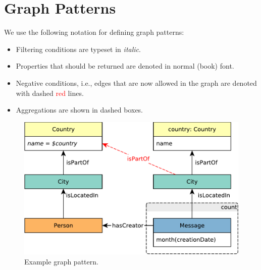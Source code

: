 \section{Graph Patterns}

We use the following notation for defining graph patterns:

\begin{itemize}
	\item Filtering conditions are typeset in \textit{italic}.
	\item Properties that should be returned are denoted in normal (book) font.
	\item Negative conditions, i.e., edges that are now allowed in the graph are denoted with dashed \textcolor{red}{red} lines.
	\item Aggregations are shown in dashed boxes.
\end{itemize}

\begin{figure}[hbp]
	\begin{center}
		\includegraphics[scale=\patternscale,margin=0cm .2cm]{patterns/q23}
		\caption{Example graph pattern.}
		\label{fig:example-graph-pattern}
	\end{center}
\end{figure}





